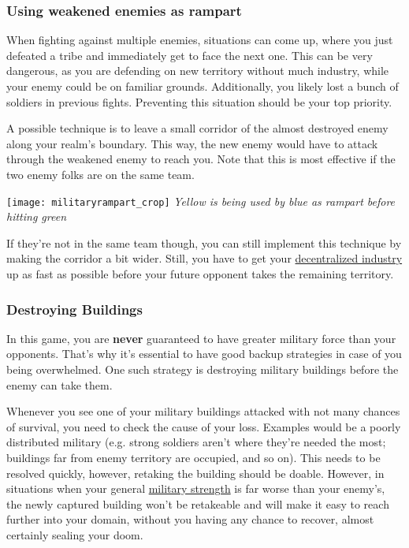 \documentclass[12pt]{article}
\begin{document}
\subsubsection{Using weakened enemies as rampart}
\label{sec:militaryrampart}

When fighting against multiple enemies, situations can come up, where you just defeated a tribe and immediately get to face the next one. This can be very dangerous, as you are defending on new territory without much industry, while your enemy could be on familiar grounds. Additionally, you likely lost a bunch of soldiers in previous fights. Preventing this situation should be your top priority.

A possible technique is to leave a small corridor of the almost destroyed enemy along your realm's boundary. This way, the new enemy would have to attack through the weakened enemy to reach you. Note that this is most effective if the two enemy folks are on the same team.

\vspace{0.6cm}
\texttt{[image: militaryrampart\_crop]}
\textit{Yellow is being used by blue as rampart before hitting green}
\vspace{1cm}

If they're not in the same team though, you can still implement this technique by making the corridor a bit wider. Still, you have to get your \hyperref[sec:decentralization]{decentralized industry} up as fast as possible before your future opponent takes the remaining territory.

\subsubsection{Destroying Buildings}
\label{sec:destroyingbuildings}

In this game, you are \textbf{never} guaranteed to have greater military force than your opponents. That's why it's essential to have good backup strategies in case of you being overwhelmed. One such strategy is destroying military buildings before the enemy can take them.

Whenever you see one of your military buildings attacked with not many chances of survival, you need to check the cause of your loss. Examples would be a poorly distributed military (e.g. strong soldiers aren't where they're needed the most; buildings far from enemy territory are occupied, and so on). This needs to be resolved quickly, however, retaking the building should be doable. However, in situations when your general \hyperref[sec:statisticsmilitary]{military strength} is far worse than your enemy's, the newly captured building won't be retakeable and will make it easy to reach further into your domain, without you having any chance to recover, almost certainly sealing your doom.
\end{document}

